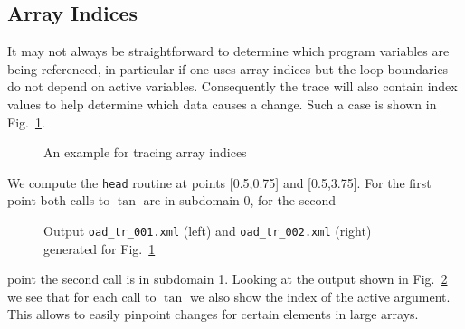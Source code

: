 \documentclass{article}
\newcommand{\reffig}[1]{{Fig.~\ref{#1}}}
\begin{document}
\subsection{Array Indices}\label{sec:ArrayIndex}
It may not always be straightforward to determine which program variables 
are being referenced, in particular if one uses array indices but the loop 
boundaries do not depend on active variables. Consequently the trace will 
also contain index values to help determine which data causes a change. 
Such a case is shown in \reffig{fig:ArrayIndex}.
\begin{figure}

\caption{An example for tracing array indices}\label{fig:ArrayIndex} 
\end{figure} 
We compute the \lstinline{head} routine at points [0.5,0.75] and [0.5,3.75].
For the first point both calls to $\tan$ are in subdomain 0, for the second 
\begin{figure}
\begin{minipage}{.5\textwidth}

\end{minipage}
\begin{minipage}{.5\textwidth}

\end{minipage}
\caption{Output \lstinline{oad_tr_001.xml} (left) 
and \lstinline{oad_tr_002.xml} (right) 
generated for \reffig{fig:ArrayIndex}}\label{fig:ArrayIndexOutput}
\end{figure}
point the second call is in subdomain 1. Looking at the output shown in \reffig{fig:ArrayIndexOutput}
we see that for each call to $\tan$ we also show the index of the active argument. 
This allows to easily pinpoint changes for certain elements in large arrays.    
\end{document}
